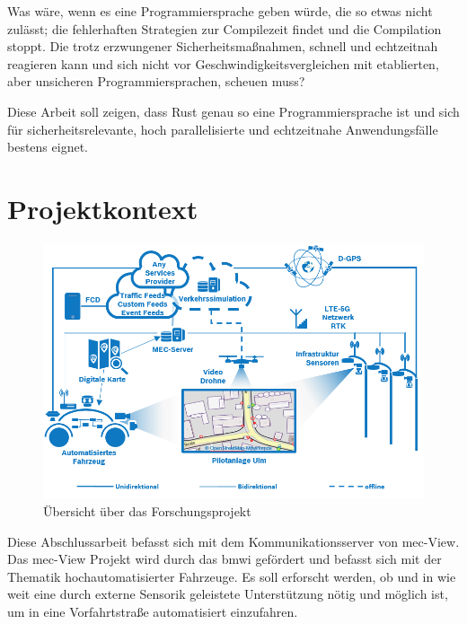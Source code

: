 Was wäre, wenn es eine Programmiersprache geben würde, die so etwas nicht zulässt; die fehlerhaften Strategien zur Compilezeit findet und die Compilation stoppt.
Die trotz erzwungener Sicherheitsmaßnahmen, schnell und echtzeitnah reagieren kann und sich nicht vor Geschwindigkeitsvergleichen mit etablierten, aber unsicheren Programmiersprachen, scheuen muss?

Diese Arbeit soll zeigen, dass Rust genau so eine Programmiersprache ist und sich für sicherheitsrelevante, hoch parallelisierte und echtzeitnahe Anwendungsfälle bestens eignet.



\clearpage %
\section{Projektkontext}
\begin{figure}[H]
	\label{test 123}
	\centering
	\includegraphics[width=\textwidth]{images/MECView_Arch_de_V1_mod.png}
	\caption{Übersicht über das Forschungsprojekt \cite{mec:home}}
\end{figure}

Diese Abschlussarbeit befasst sich mit dem Kommunikationsserver von \gls{mec}-View.
Das \gls{mec}-View Projekt wird durch das \gls{bmwi} gefördert und befasst sich mit der Thematik hochautomatisierter Fahrzeuge.
Es soll erforscht werden, ob und in wie weit eine durch externe Sensorik geleistete Unterstützung nötig und möglich ist, um in eine Vorfahrtstraße automatisiert einzufahren.

